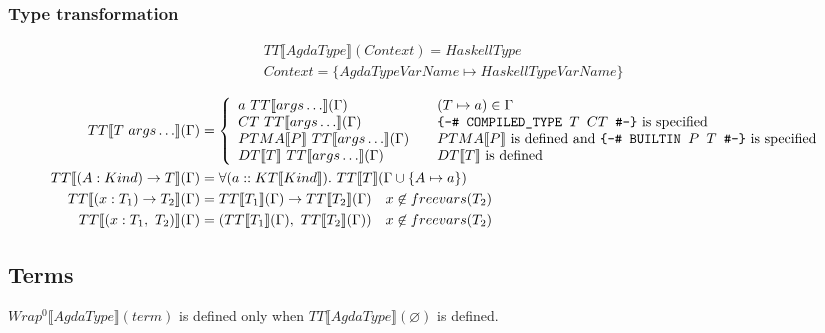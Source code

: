 \subsubsection{Type transformation}

\begin{align*}
   &TT\llbracket AgdaType \rrbracket(Context) = HaskellType\\
   &Context = \{ AgdaTypeVarName \mapsto HaskellTypeVarName \}
\end{align*}

\begin{align*}
   TT\llbracket T\ args\ldots \rrbracket(\Gamma) &= \left\{
      \begin{array}{l l}
         a\ TT\llbracket args\ldots \rrbracket(\Gamma) &\quad (T \mapsto a) \in \Gamma \\
         CT\ TT\llbracket args\ldots \rrbracket(\Gamma) &\quad
            \text{\texttt{\{-\# COMPILED\_TYPE \(T\) \(CT\) \#-\}} is specified}\\
         PTMA\llbracket P \rrbracket\ TT\llbracket args\ldots \rrbracket(\Gamma) &\quad
            \text{\(PTMA\llbracket P \rrbracket\) is defined and
            \texttt{\{-\# BUILTIN \(P\) \(T\) \#-\}} is specified}\\
         DT\llbracket T \rrbracket\ TT\llbracket args\ldots \rrbracket(\Gamma) &\quad
            \text{\(DT\llbracket T \rrbracket\) is defined}\\
      \end{array}\right.\\
   TT\llbracket (A : Kind) \rightarrow T \rrbracket(\Gamma) &= \forall (a :: KT\llbracket Kind \rrbracket).
      \ TT\llbracket T \rrbracket(\Gamma \cup \{A \mapsto a\})\\
   TT\llbracket (x : T_1) \rightarrow T_2 \rrbracket(\Gamma) &=
      TT\llbracket T_1 \rrbracket(\Gamma) \rightarrow TT\llbracket T_2 \rrbracket(\Gamma)
      \quad x \not\in freevars(T_2) \\
   TT\llbracket (x : T_1,\ T_2) \rrbracket(\Gamma) &=
      (TT\llbracket T_1 \rrbracket(\Gamma),\ TT\llbracket T_2 \rrbracket(\Gamma))
      \quad x \not\in freevars(T_2) \\
\end{align*}

\subsection{Terms}

\(Wrap^0\llbracket AgdaType \rrbracket(term)\) is defined only when \(TT\llbracket AgdaType \rrbracket(\varnothing)\) is defined.

